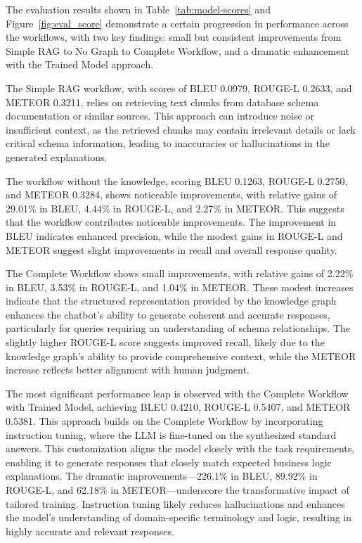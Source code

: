 \documentclass[11pt]{article}
\begin{document}
The evaluation results shown in Table~\ref{tab:model-scores} and Figure~\ref{fig:eval_score}  demonstrate a certain progression in performance across the workflows, with two key findings: small but consistent improvements from Simple RAG to No Graph to Complete Workflow, and a dramatic enhancement with the Trained Model approach.

The Simple RAG workflow, with scores of BLEU 0.0979, ROUGE-L 0.2633, and METEOR 0.3211, relies on retrieving text chunks from database schema documentation or similar sources. This approach can introduce noise or insufficient context, as the retrieved chunks may contain irrelevant details or lack critical schema information, leading to inaccuracies or hallucinations in the generated explanations. 

The workflow without the knowledge, scoring BLEU 0.1263, ROUGE-L 0.2750, and METEOR 0.3284, shows noticeable improvements, with relative gains of 29.01\% in BLEU, 4.44\% in ROUGE-L, and 2.27\% in METEOR. This suggests that the workflow contributes noticeable improvements. The improvement in BLEU indicates enhanced precision, while the modest gains in ROUGE-L and METEOR suggest slight improvements in recall and overall response quality.

The Complete Workflow shows small improvements, with relative gains of 2.22\% in BLEU, 3.53\% in ROUGE-L, and 1.04\% in METEOR. These modest increases indicate that the structured representation provided by the knowledge graph enhances the chatbot’s ability to generate coherent and accurate responses, particularly for queries requiring an understanding of schema relationships. The slightly higher ROUGE-L score suggests improved recall, likely due to the knowledge graph’s ability to provide comprehensive context, while the METEOR increase reflects better alignment with human judgment.

The most significant performance leap is observed with the Complete Workflow with Trained Model, achieving BLEU 0.4210, ROUGE-L 0.5407, and METEOR 0.5381. This approach builds on the Complete Workflow by incorporating instruction tuning, where the LLM is fine-tuned on the synthesized standard answers. This customization aligns the model closely with the task requirements, enabling it to generate responses that closely match expected business logic explanations. The dramatic improvements—226.1\% in BLEU, 89.92\% in ROUGE-L, and 62.18\% in METEOR—underscore the transformative impact of tailored training. Instruction tuning likely reduces hallucinations and enhances the model’s understanding of domain-specific terminology and logic, resulting in highly accurate and relevant responses.
\end{document}
